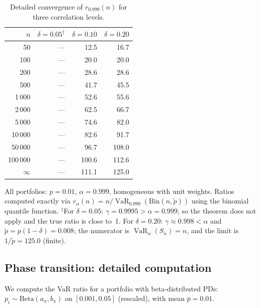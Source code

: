 \documentclass[11pt]{article}
\theoremstyle{definition}
\newcommand{\VaR}{\operatorname{VaR}}
\newcommand{\1}{\mathbf{1}}
\begin{document}
\begin{table}[h]
\centering
\caption{Detailed convergence of $r_{0.999}(n)$ for three correlation levels.}
\label{tab:detailed_conv}
\begin{tabular}{rrrr}
\toprule
$n$ & $\delta = 0.05^{\dagger}$ & $\delta = 0.10$ & $\delta = 0.20$ \\
\midrule
50 & --- & 12.5 & 16.7 \\
100 & --- & 20.0 & 20.0 \\
200 & --- & 28.6 & 28.6 \\
500 & --- & 41.7 & 45.5 \\
1\,000 & --- & 52.6 & 55.6 \\
2\,000 & --- & 62.5 & 66.7 \\
5\,000 & --- & 74.6 & 82.0 \\
10\,000 & --- & 82.6 & 91.7 \\
50\,000 & --- & 96.7 & 108.0 \\
100\,000 & --- & 100.6 & 112.6 \\
$\infty$ & --- & 111.1 & 125.0 \\
\bottomrule
\end{tabular}
\begin{flushleft}
\small All portfolios: $p = 0.01$, $\alpha = 0.999$, homogeneous with unit weights. Ratios computed exactly via $r_\alpha(n) = n / \VaR_{0.999}(\mathrm{Bin}(n, \tilde{p}))$ using the binomial quantile function. ${}^{\dagger}$For $\delta = 0.05$: $\gamma = 0.9995 > \alpha = 0.999$, so the theorem does not apply and the true ratio is close to~1. For $\delta = 0.20$: $\gamma \approx 0.998 < \alpha$ and $\tilde{p} = p(1-\delta) = 0.008$; the numerator is $\VaR_\alpha(S_n) = n$, and the limit is $1/\tilde{p} = 125.0$ (finite).
\end{flushleft}
\end{table}

\subsection{Phase transition: detailed computation}

We compute the VaR ratio for a portfolio with beta-distributed PDs: $p_i \sim \mathrm{Beta}(a_\pi, b_\pi)$ on $[0.001, 0.05]$ (rescaled), with mean $\bar{p} = 0.01$.
\end{document}
